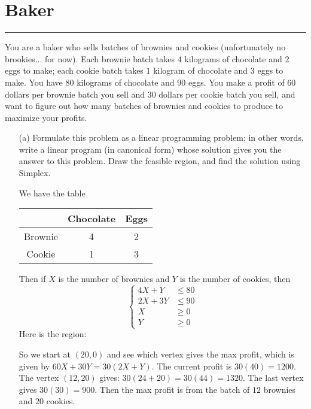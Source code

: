 \documentclass{article}
\begin{document}
\newpage
\section*{Baker}
\hrule

You are a baker who sells batches of brownies and cookies (unfortunately no brookies... for now). Each brownie batch takes $4$ kilograms of chocolate and $2$ eggs to make; each cookie batch takes $1$ kilogram of chocolate and $3$ eggs to make. You have $80$ kilograms of chocolate and $90$ eggs. You make a profit of $60$ dollars per brownie batch you sell and $30$ dollars per cookie batch you sell, and want to figure out how many batches of brownies and cookies to produce to maximize your profits.
    \begin{itemize}
        \item [(a)] Formulate this problem as a linear programming problem; in other words, write a linear program (in canonical form) whose solution gives you the answer to this problem. Draw the feasible region, and find the solution using Simplex.
            \begin{answer}
                We have the table
                    \begin{center}
                        \begin{tabular}{ c c c }
                            \hline         & Chocolate & Eggs \\
                            \hline Brownie & 4         & 2    \\
                            \hline Cookie  & 1         & 3      
                        \end{tabular}
                    \end{center}
                Then if $X$ is the number of brownies and $Y$ is the number of cookies, then
                    \begin{equation*}
                        \begin{cases}
                            4X + Y &\leq 80  \\
                            2X + 3Y &\leq 90 \\
                            X & \geq 0 \\
                            Y & \geq 0
                        \end{cases}
                    \end{equation*}
                Here is the region:
                    \begin{fixedfigure}
                    \end{fixedfigure}
                So we start at $(20, 0)$ and see which vertex gives the max profit, which is given by $60X + 30Y = 30(2X + Y)$. The current profit is $30(40) = 1200$. The vertex $(12, 20)$ gives: $30(24 + 20) = 30(44) = 1320$. The last vertex gives $30(30) = 900$. Then the max profit is from the batch of $12$ brownies and $20$ cookies.
            \end{answer}


\end{itemize}
\end{document}
